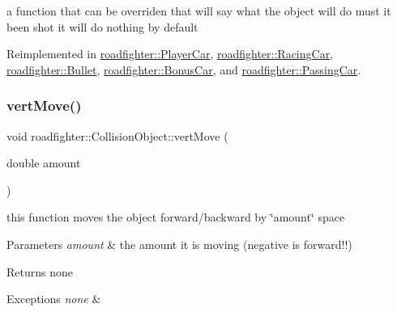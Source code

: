 a function that can be overriden that will say what the object will do must it been shot it will do nothing by default 

Reimplemented in \hyperlink{classroadfighter_1_1PlayerCar_a592556a1c6326c9d9a70691f036eaafc}{roadfighter\+::\+Player\+Car}, \hyperlink{classroadfighter_1_1RacingCar_a20c4363a1d31cc17d7d82c8f9a219d2d}{roadfighter\+::\+Racing\+Car}, \hyperlink{classroadfighter_1_1Bullet_acaacd303f1f4e55c5029d4a4cbe1d9b1}{roadfighter\+::\+Bullet}, \hyperlink{classroadfighter_1_1BonusCar_a02edcd22a86c1f98642c3703ef8dfb16}{roadfighter\+::\+Bonus\+Car}, and \hyperlink{classroadfighter_1_1PassingCar_ac04b801b789bf880011d5cdb1ffdec59}{roadfighter\+::\+Passing\+Car}.

\mbox{\label{classroadfighter_1_1CollisionObject_aaf92d0fe335daa016b5131835602bc1d}} 
\subsubsection{\texorpdfstring{vert\+Move()}{vertMove()}}
{\footnotesize\ttfamily void roadfighter\+::\+Collision\+Object\+::vert\+Move (\begin{DoxyParamCaption}\item[{double}]{amount }\end{DoxyParamCaption})}

this function moves the object forward/backward by \char`\"{}amount\char`\"{} space 
\begin{DoxyParams}{Parameters}
{\em amount} & the amount it is moving (negative is forward!!) \\
\hline
\end{DoxyParams}
\begin{DoxyReturn}{Returns}
none 
\end{DoxyReturn}

\begin{DoxyExceptions}{Exceptions}
{\em none} & \\
\hline
\end{DoxyExceptions}
\mbox{\label{classroadfighter_1_1CollisionObject_aa793e1b9943ee90bbb4129ddd06b9be7}} 
